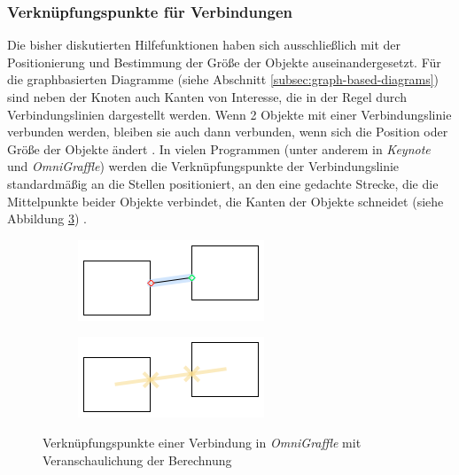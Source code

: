 \subsubsection{Verknüpfungspunkte für Verbindungen}
\label{subsubsec:connection-points}

Die bisher diskutierten Hilfefunktionen haben sich ausschließlich mit der Positionierung und Bestimmung der Größe der Objekte auseinandergesetzt. Für die graphbasierten Diagramme (siehe Abschnitt \ref{subsec:graph-based-diagrams}) sind neben der Knoten auch Kanten von Interesse, die in der Regel durch Verbindungslinien dargestellt werden. Wenn 2 Objekte mit einer Verbindungslinie verbunden werden, bleiben sie auch dann verbunden, wenn sich die Position oder Größe der Objekte ändert \cite{11Keynote}. In vielen Programmen (unter anderem in \textit{Keynote} und \textit{OmniGraffle}) werden die Verknüpfungspunkte der Verbindungslinie standardmäßig an die Stellen positioniert, an den eine gedachte Strecke, die die Mittelpunkte beider Objekte verbindet, die Kanten der Objekte schneidet (siehe Abbildung \ref{fig:omnigraffle-connection-points}) \cite{08OmniGraffle}.

\begin{figure}[hbt]
    \newcommand{\subfigurewidth}{0.5\textwidth}
    \newcommand{\graphicswidth}{0.8\linewidth}
    \begin{subfigure}{\subfigurewidth}
        \centering
        \includegraphics[width=\graphicswidth]{resources/omnigraffle-connection-points-a}
        \caption{}
        \label{fig:omnigraffle-connection-points-a}
    \end{subfigure}
    \begin{subfigure}{\subfigurewidth}
        \centering
        \includegraphics[width=\graphicswidth]{resources/omnigraffle-connection-points-b}
        \caption{}
        \label{fig:omnigraffle-connection-points-b}
    \end{subfigure}
    \caption{Verknüpfungspunkte einer Verbindung in \textit{OmniGraffle}  mit Veranschaulichung der Berechnung }
    \label{fig:omnigraffle-connection-points}
\end{figure}

